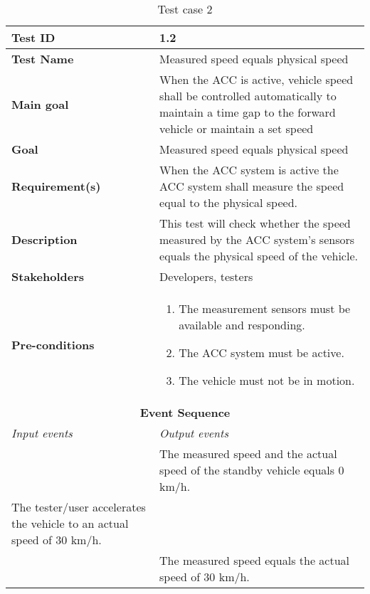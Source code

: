 \begin{table}[H]
\centering
\begin{tabularx}{\linewidth}{X|X}
  \hline
  \textbf{Test ID} & 1.2 \\
  \hline
  \textbf{Test Name} & Measured speed equals physical speed \\
  \hline
  \textbf{Main goal} & When the ACC is active, vehicle speed shall be controlled automatically to maintain a time gap to the forward vehicle or maintain a set speed  \\
  \hline
  \textbf{Goal} & Measured speed equals physical speed \\
  \hline
  \textbf{Requirement(s)} & When the ACC system is active the ACC system shall measure the speed equal to the physical speed. \\
  \hline
  \textbf{Description} & This test will check whether the speed measured by the ACC system's sensors equals the physical speed of the vehicle. \\
  \hline
  \textbf{Stakeholders} & Developers, testers  \\
  \hline
  \textbf{Pre-conditions} &  
  
  \begin{enumerate}
      \item The measurement sensors must be available and responding.
      \item The ACC system must be active.
      \item The vehicle must not be in motion.
  \end{enumerate}
  \\
  \hline
  \multicolumn{2}{c}{\textbf{Event Sequence}} \\
  \hline
  \textit{Input events} & \textit{Output events} \\
  \hline
   &  The measured speed and the actual speed of the standby vehicle equals 0 km/h.\\
  \hline
   The tester/user accelerates the vehicle to an actual speed of 30 km/h. &  \\
  \hline
   &  The measured speed equals the actual speed of 30 km/h. \\
  \hline
  \end{tabularx}
\caption{\label{tab_case2} Test case 2}
\end{table}

